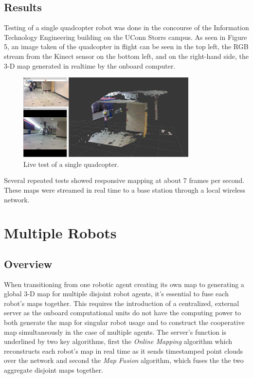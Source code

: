 \documentclass[letterpaper, oneside, 10pt]{report}
\begin{document}
\section{Results}
\noindent Testing of a single quadcopter robot was done in the concourse of the Information Technology Engineering building on the UConn Storrs campus. As seen in Figure 5, an image taken of the quadcopter in flight can be seen in the top left, the RGB stream from the Kinect sensor on the bottom left, and on the right-hand side, the 3-D map generated in realtime by the onboard computer.

\begin{figure}[h]
 \caption{Live test of a single quadcopter.}
 \centering
   \includegraphics[width=0.8\textwidth]{images/single_test}
\end{figure}

\noindent Several repeated tests showed responsive mapping at about 7 frames per second. These maps were streamed in real time to a base station through a local wireless network.

\chapter{Multiple Robots}

\section{Overview}

When transitioning from one robotic agent creating its own map to generating a global 3-D map for multiple disjoint robot agents, it's essential to fuse each robot's maps together. This requires the introduction of a centralized, external server as the onboard computational units do not have the computing power to both generate the map for singular robot usage and to construct the cooperative map simultaneously in the case of multiple agents. The server's function is underlined by two key algorithms, first the \textsl{Online Mapping} algorithm which reconstructs each robot's map in real time as it sends timestamped point clouds over the network and second the \textsl{Map Fusion} algorithm, which fuses the the two aggregate disjoint maps together.
\end{document}
